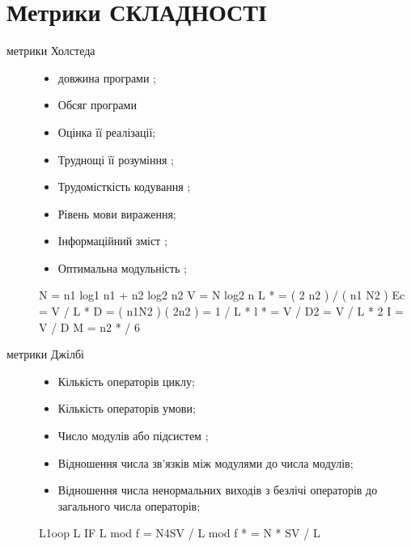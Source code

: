 \documentclass[oneside,final,14pt]{extreport}
\begin{document}
\section{Метрики СКЛАДНОСТІ}
\label{2section:id7}\begin{description}
\item[{метрики Холстеда}] \leavevmode\begin{itemize}
\item {} 
довжина програми ;

\item {} 
Обсяг програми

\item {} 
Оцінка її реалізації;

\item {} 
Труднощі її розуміння ;

\item {} 
Трудомісткість кодування ;

\item {} 
Рівень мови вираження;

\item {} 
Інформаційний зміст ;

\item {} 
Оптимальна модульність ;

\end{itemize}

N = n1 log1 n1 + n2 log2 n2
V = N log2 n
L * = ( 2 n2 ) / ( n1 N2 )
Ec = V / L *
D = ( n1N2 ) ( 2n2 ) = 1 / L *
l * = V / D2 = V / L * 2
I = V / D
M = n2 * / 6

\item[{метрики Джілбі}] \leavevmode\begin{itemize}
\item {} 
Кількість операторів циклу;

\item {} 
Кількість операторів умови;

\item {} 
Число модулів або підсистем ;

\item {} 
Відношення числа зв'язків між модулями до числа модулів;

\item {} 
Відношення числа ненормальних виходів з безлічі операторів до загального числа операторів;

\end{itemize}

L1oop
L IF
L mod
f = N4SV / L mod
f * = N * SV / L


\end{description}
\end{document}
